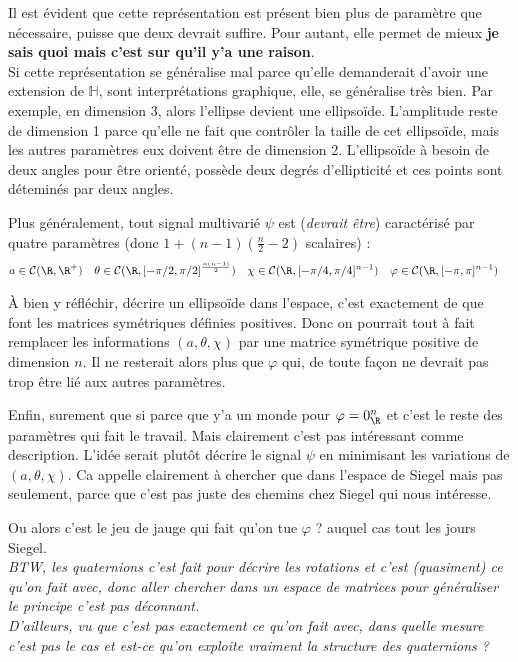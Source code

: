 Il est évident que cette représentation est présent bien plus de paramètre que nécessaire, puisse que deux devrait suffire. Pour autant, elle permet de mieux \textbf{je sais quoi mais c'est sur qu'il y'a une raison}.
\\
Si cette représentation se généralise mal parce qu'elle demanderait d'avoir une extension de $\mathbb{H}$, sont interprétations graphique, elle, se généralise très bien. Par exemple, en dimension 3, alors l'ellipse devient une ellipsoïde. L'amplitude reste de dimension 1 parce qu'elle ne fait que contrôler la taille de cet ellipsoïde, mais les autres paramètres eux doivent être de dimension 2. L'ellipsoïde à besoin de deux angles pour être orienté, possède deux degrés d'ellipticité et ces points sont déteminés par deux angles.


\begin{proposition}\label{prop:gene_param_signal_v1}
Plus généralement, tout signal multivarié $\psi$ est (\textit{devrait être}) caractérisé par quatre paramètres (donc $1+(n-1)(\frac{n}{2}-2)$ scalaires) :
\begin{align*}
	a&\in\mathcal{C}(\R,\R^+)  &  \theta&\in\mathcal{C}(\R, [-\pi/2,\pi/2]^{\frac{n(n-1)}{2}})  &  \chi&\in\mathcal{C}(\R, [-\pi/4,\pi/4]^{n-1})  &  \varphi&\in\mathcal{C}(\R, [-\pi,\pi]^{n-1})
\end{align*}	
\end{proposition}

\`A bien y réfléchir, décrire un ellipsoïde dans l'espace, c'est exactement de que font les matrices symétriques définies positives. Donc on pourrait tout à fait remplacer les informations $(a,\theta,\chi)$ par une matrice symétrique positive de dimension $n$. Il ne resterait alors plus que $\varphi$ qui, de toute façon ne devrait pas trop être lié aux autres paramètres.

Enfin, surement que si parce que y'a un monde pour $\varphi=0_\R^n$ et c'est le reste des paramètres qui fait le travail. Mais clairement c'est pas intéressant comme description. L'idée serait plutôt décrire le signal $\psi$ en minimisant les variations de $(a,\theta,\chi)$.
Ca appelle clairement à chercher que dans l'espace de Siegel mais pas seulement, parce que c'est pas juste des chemins chez Siegel qui nous intéresse.

Ou alors c'est le jeu de jauge qui fait qu'on tue $\varphi$ ? auquel cas tout les jours Siegel.
\\

\textit{BTW, les quaternions c'est fait pour décrire les rotations et c'est (quasiment) ce qu'on fait avec, donc aller chercher dans un espace de matrices pour généraliser le principe c'est pas déconnant.}
\\
\textit{D'ailleurs, vu que c'est pas exactement ce qu'on fait avec, dans quelle mesure c'est pas le cas et est-ce qu'on exploite vraiment la structure des quaternions ?}



